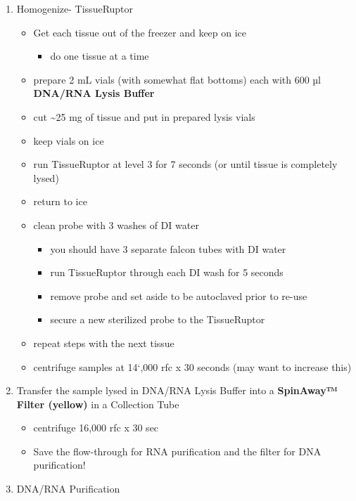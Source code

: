 \documentclass[
  letterpaper,
  DIV=11,
  numbers=noendperiod]{scrreprt}
\providecommand{\tightlist}{%
  \setlength{\itemsep}{0pt}\setlength{\parskip}{0pt}}\usepackage{longtable,booktabs,array}
\begin{document}
\begin{enumerate}
\def\labelenumi{\arabic{enumi}.}
\item
  Homogenize- TissueRuptor

  \begin{itemize}
  \item
    Get each tissue out of the freezer and keep on ice

    \begin{itemize}
    \tightlist
    \item
      do one tissue at a time
    \end{itemize}
  \item
    prepare 2 mL vials (with somewhat flat bottoms) each with 600 µl
    \textbf{DNA/RNA Lysis Buffer}
  \item
    cut \textasciitilde25 mg of tissue and put in prepared lysis vials
  \item
    keep vials on ice
  \item
    run TissueRuptor at level 3 for 7 seconds (or until tissue is
    completely lysed)
  \item
    return to ice
  \item
    clean probe with 3 washes of DI water

    \begin{itemize}
    \item
      you should have 3 separate falcon tubes with DI water
    \item
      run TissueRuptor through each DI wash for 5 seconds
    \item
      remove probe and set aside to be autoclaved prior to re-use
    \item
      secure a new sterilized probe to the TissueRuptor
    \end{itemize}
  \item
    repeat steps with the next tissue
  \item
    centrifuge samples at 14`,000 rfc x 30 seconds (may want to increase
    this)
  \end{itemize}
\item
  Transfer the sample lysed in DNA/RNA Lysis Buffer into a
  \textbf{SpinAway™ Filter (yellow)} in a Collection Tube

  \begin{itemize}
  \item
    centrifuge 16,000 rfc x 30 sec
  \item
    Save the flow-through for RNA purification and the filter for DNA
    purification!
  \end{itemize}
\item
  DNA/RNA Purification


\end{enumerate}
\end{document}
